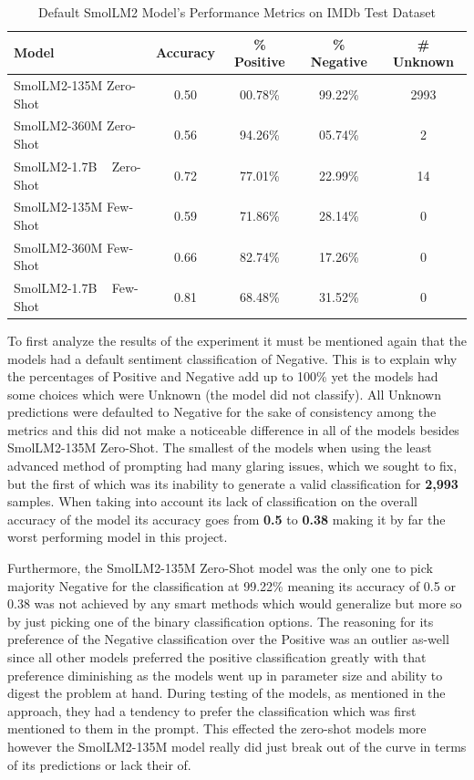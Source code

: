 \documentclass[10pt,twocolumn,letterpaper]{article}
\begin{document}
\begin{table}[ht]
\centering
\begin{tabular}{|l|c|c|c|c|}
\hline
\textbf{Model} & \textbf{Accuracy} & \textbf{\% Positive} & \textbf{\% Negative} & \textbf{\# Unknown} \\ 
\hline\hline
SmolLM2-135M Zero-Shot   & 0.50 & 00.78\%  & 99.22\% & 2993 \\ 
SmolLM2-360M Zero-Shot   & 0.56 & 94.26\%  & 05.74\% & 2    \\ 
SmolLM2-1.7B ~ Zero-Shot   & 0.72 & 77.01\%  & 22.99\% & 14   \\ 
SmolLM2-135M Few-Shot    & 0.59 & 71.86\%  & 28.14\% & 0    \\ 
SmolLM2-360M Few-Shot    & 0.66 & 82.74\%  & 17.26\% & 0    \\ 
SmolLM2-1.7B ~ Few-Shot    & 0.81 & 68.48\%  & 31.52\% & 0    \\ 
\hline
\end{tabular}
\caption{Default SmolLM2 Model's Performance Metrics on IMDb Test Dataset}
\label{tab:default-smollm-metrics}
\end{table}

To first analyze the results of the experiment it must be mentioned again that the models had a default sentiment classification of Negative. This is to explain why the percentages of Positive and Negative add up to 100\% yet the models had some choices which were Unknown (the model did not classify). All Unknown predictions were defaulted to Negative for the sake of consistency among the metrics and this did not make a noticeable difference in all of the models besides SmolLM2-135M Zero-Shot. The smallest of the models when using the least advanced method of prompting had many glaring issues, which we sought to fix, but the first of which was its inability to generate a valid classification for \textbf{2,993} samples. When taking into account its lack of classification on the overall accuracy of the model its accuracy goes from \textbf{0.5} to \textbf{0.38} making it by far the worst performing model in this project. 

Furthermore, the SmolLM2-135M Zero-Shot model was the only one to pick majority Negative for the classification at 99.22\% meaning its accuracy of 0.5 or 0.38 was not achieved by any smart methods which would generalize but more so by just picking one of the binary classification options. The reasoning for its preference of the Negative classification over the Positive was an outlier as-well since all other models preferred the positive classification greatly with that preference diminishing as the models went up in parameter size and ability to digest the problem at hand. During testing of the models, as mentioned in the approach, they had a tendency to prefer the classification which was first mentioned to them in the prompt. This effected the zero-shot models more however the SmolLM2-135M model really did just break out of the curve in terms of its predictions or lack their of. 
\end{document}
